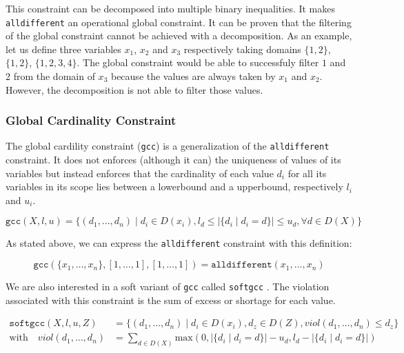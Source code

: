 \documentclass[../../thesis.tex]{subfiles}
\begin{document}
This constraint can be decomposed into multiple binary inequalities. It makes \texttt{alldifferent} an operational global constraint.
It can be proven that the filtering of the global constraint cannot be achieved with a decomposition. As 
an example, let us define three variables $x_1$, $x_2$ and $x_3$ respectively taking domains $\{1,2\}$, $\{1,2\}$, $\{1,2,3,4\}$. 
The global constraint would be able to successfuly filter $1$ and $2$ from the domain of 
$x_3$ because the values are always taken by $x_1$ and $x_2$. However, the decomposition is not able to filter those values.


\subsubsection{Global Cardinality Constraint}
\label{sota:gcc}

The global cardility constraint (\texttt{gcc}) \cite{Regin:1996} is a generalization of the 
\texttt{alldifferent} constraint. It does not enforces (although it can) the uniqueness of values of its variables
but instead enforces that the cardinality of each value $d_i$ for all its variables in its scope lies
between a lowerbound and a upperbound, respectively $l_i$ and $u_i$. 

\begin{equation*}
  \texttt{gcc}(X, l, u) = \{ (d_1, \dots, d_n) \mid d_i \in D(x_i), l_d \leq |\{ d_i \mid d_i = d \}| \leq u_d, \forall d \in D(X) \}
\end{equation*}

As stated above, we can express the \texttt{alldifferent} constraint with this definition:

\begin{equation*}
\texttt{gcc}(\{ x_1, \dots, x_n \}, [1, \dots, 1], [1, \dots, 1]) = \texttt{alldifferent}(x_1, \dots, x_n)
\end{equation*}


We are also interested in a soft variant of \texttt{gcc} called \texttt{softgcc} \cite{VanHoeve2006}. 
The violation associated with this constraint is the sum of excess or shortage \cite{schaus:softgcc} for each value.

\begin{align*}
  \texttt{softgcc}(X, l, u, Z) &= \{ (d_1, \dots, d_n) \mid d_i \in D(x_i), d_z \in D(Z), viol(d_1, \dots, d_n) \leq d_z \} \\
  \text{with} \quad viol(d_1, \dots, d_n) &= \sum_{d \in D(X)} \text{max}(0, |\{ d_i \mid d_i = d \}| - u_d, l_d - |\{ d_i \mid d_i = d \}|)
\end{align*}
\end{document}
